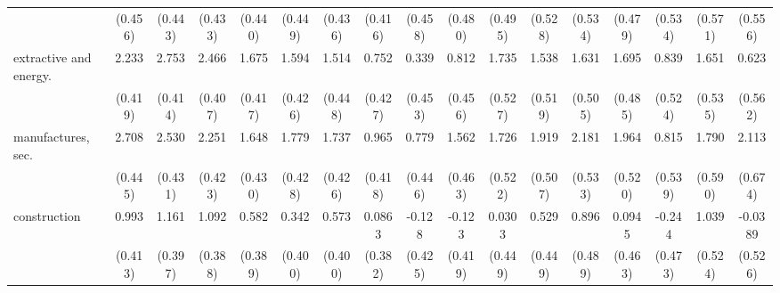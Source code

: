 {\begin{tabular}{l*{16}{c}}
                    &     (0.456)         &     (0.443)         &     (0.433)         &     (0.440)         &     (0.449)         &     (0.436)         &     (0.416)         &     (0.458)         &     (0.480)         &     (0.495)         &     (0.528)         &     (0.534)         &     (0.479)         &     (0.534)         &     (0.571)         &     (0.556)         \\
[1em]
extractive and energy.&       2.233\sym{***}&       2.753\sym{***}&       2.466\sym{***}&       1.675\sym{***}&       1.594\sym{***}&       1.514\sym{***}&       0.752         &       0.339         &       0.812         &       1.735\sym{**} &       1.538\sym{**} &       1.631\sym{**} &       1.695\sym{***}&       0.839         &       1.651\sym{**} &       0.623         \\
                    &     (0.419)         &     (0.414)         &     (0.407)         &     (0.417)         &     (0.426)         &     (0.448)         &     (0.427)         &     (0.453)         &     (0.456)         &     (0.527)         &     (0.519)         &     (0.505)         &     (0.485)         &     (0.524)         &     (0.535)         &     (0.562)         \\
[1em]
manufactures, sec.  &       2.708\sym{***}&       2.530\sym{***}&       2.251\sym{***}&       1.648\sym{***}&       1.779\sym{***}&       1.737\sym{***}&       0.965\sym{*}  &       0.779         &       1.562\sym{***}&       1.726\sym{***}&       1.919\sym{***}&       2.181\sym{***}&       1.964\sym{***}&       0.815         &       1.790\sym{**} &       2.113\sym{**} \\
                    &     (0.445)         &     (0.431)         &     (0.423)         &     (0.430)         &     (0.428)         &     (0.426)         &     (0.418)         &     (0.446)         &     (0.463)         &     (0.522)         &     (0.507)         &     (0.533)         &     (0.520)         &     (0.539)         &     (0.590)         &     (0.674)         \\
[1em]
construction        &       0.993\sym{*}  &       1.161\sym{**} &       1.092\sym{**} &       0.582         &       0.342         &       0.573         &      0.0863         &      -0.128         &      -0.123         &      0.0303         &       0.529         &       0.896         &      0.0945         &      -0.244         &       1.039\sym{*}  &     -0.0389         \\
                    &     (0.413)         &     (0.397)         &     (0.388)         &     (0.389)         &     (0.400)         &     (0.400)         &     (0.382)         &     (0.425)         &     (0.419)         &     (0.449)         &     (0.449)         &     (0.489)         &     (0.463)         &     (0.473)         &     (0.524)         &     (0.526)         \\

\end{tabular}}
